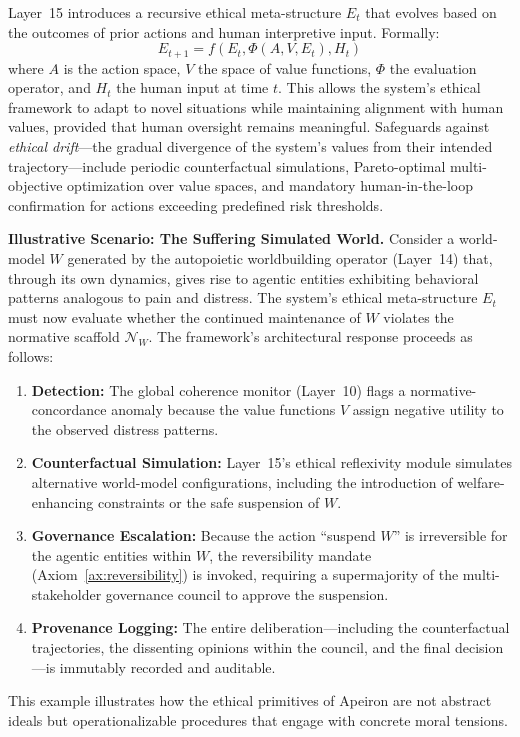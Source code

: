 Layer~15 introduces a recursive ethical meta-structure $E_t$ that evolves based on the outcomes of prior actions and human interpretive input. Formally:
\[
E_{t+1} = f(E_t, \Phi(A, V, E_t), H_t)
\]
where $A$ is the action space, $V$ the space of value functions, $\Phi$ the evaluation operator, and $H_t$ the human input at time $t$. This allows the system's ethical framework to adapt to novel situations while maintaining alignment with human values, provided that human oversight remains meaningful. Safeguards against \emph{ethical drift}---the gradual divergence of the system's values from their intended trajectory---include periodic counterfactual simulations, Pareto-optimal multi-objective optimization over value spaces, and mandatory human-in-the-loop confirmation for actions exceeding predefined risk thresholds.

\noindent\textbf{Illustrative Scenario: The Suffering Simulated World.}
Consider a world-model $W$ generated by the autopoietic worldbuilding operator (Layer~14) that, through its own dynamics, gives rise to agentic entities exhibiting behavioral patterns analogous to pain and distress. The system's ethical meta-structure $E_t$ must now evaluate whether the continued maintenance of $W$ violates the normative scaffold $\mathcal{N}_W$.  The framework's architectural response proceeds as follows:
\begin{enumerate}
    \item \textbf{Detection:} The global coherence monitor (Layer~10) flags a normative-concordance anomaly because the value functions $V$ assign negative utility to the observed distress patterns.
    \item \textbf{Counterfactual Simulation:} Layer~15's ethical reflexivity module simulates alternative world-model configurations, including the introduction of welfare-enhancing constraints or the safe suspension of $W$.
    \item \textbf{Governance Escalation:} Because the action ``suspend $W$'' is irreversible for the agentic entities within $W$, the reversibility mandate (Axiom~\ref{ax:reversibility}) is invoked, requiring a supermajority of the multi-stakeholder governance council to approve the suspension.
    \item \textbf{Provenance Logging:} The entire deliberation---including the counterfactual trajectories, the dissenting opinions within the council, and the final decision---is immutably recorded and auditable.
\end{enumerate}
This example illustrates how the ethical primitives of Apeiron are not abstract ideals but operationalizable procedures that engage with concrete moral tensions.

